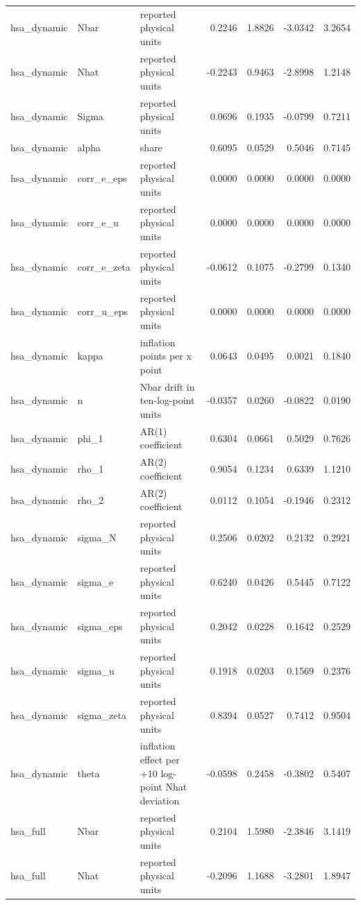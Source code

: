 \begin{tabular}{lllrrrr}
hsa\_dynamic & Nbar & reported physical units & 0.2246 & 1.8826 & -3.0342 & 3.2654 \\
hsa\_dynamic & Nhat & reported physical units & -0.2243 & 0.9463 & -2.8998 & 1.2148 \\
hsa\_dynamic & Sigma & reported physical units & 0.0696 & 0.1935 & -0.0799 & 0.7211 \\
hsa\_dynamic & alpha & share & 0.6095 & 0.0529 & 0.5046 & 0.7145 \\
hsa\_dynamic & corr\_e\_eps & reported physical units & 0.0000 & 0.0000 & 0.0000 & 0.0000 \\
hsa\_dynamic & corr\_e\_u & reported physical units & 0.0000 & 0.0000 & 0.0000 & 0.0000 \\
hsa\_dynamic & corr\_e\_zeta & reported physical units & -0.0612 & 0.1075 & -0.2799 & 0.1340 \\
hsa\_dynamic & corr\_u\_eps & reported physical units & 0.0000 & 0.0000 & 0.0000 & 0.0000 \\
hsa\_dynamic & kappa & inflation points per x point & 0.0643 & 0.0495 & 0.0021 & 0.1840 \\
hsa\_dynamic & n & Nbar drift in ten-log-point units & -0.0357 & 0.0260 & -0.0822 & 0.0190 \\
hsa\_dynamic & phi\_1 & AR(1) coefficient & 0.6304 & 0.0661 & 0.5029 & 0.7626 \\
hsa\_dynamic & rho\_1 & AR(2) coefficient & 0.9054 & 0.1234 & 0.6339 & 1.1210 \\
hsa\_dynamic & rho\_2 & AR(2) coefficient & 0.0112 & 0.1054 & -0.1946 & 0.2312 \\
hsa\_dynamic & sigma\_N & reported physical units & 0.2506 & 0.0202 & 0.2132 & 0.2921 \\
hsa\_dynamic & sigma\_e & reported physical units & 0.6240 & 0.0426 & 0.5445 & 0.7122 \\
hsa\_dynamic & sigma\_eps & reported physical units & 0.2042 & 0.0228 & 0.1642 & 0.2529 \\
hsa\_dynamic & sigma\_u & reported physical units & 0.1918 & 0.0203 & 0.1569 & 0.2376 \\
hsa\_dynamic & sigma\_zeta & reported physical units & 0.8394 & 0.0527 & 0.7412 & 0.9504 \\
hsa\_dynamic & theta & inflation effect per +10 log-point Nhat deviation & -0.0598 & 0.2458 & -0.3802 & 0.5407 \\
hsa\_full & Nbar & reported physical units & 0.2104 & 1.5980 & -2.3846 & 3.1419 \\
hsa\_full & Nhat & reported physical units & -0.2096 & 1.1688 & -3.2801 & 1.8947 \\

\end{tabular}
